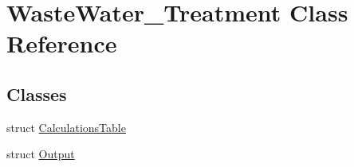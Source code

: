 \hypertarget{class_waste_water___treatment}{}\section{Waste\+Water\+\_\+\+Treatment Class Reference}
\label{class_waste_water___treatment}
\subsection*{Classes}
\begin{DoxyCompactItemize}
\item 
struct \hyperlink{struct_waste_water___treatment_1_1_calculations_table}{Calculations\+Table}
\item 
struct \hyperlink{struct_waste_water___treatment_1_1_output}{Output}
\end{DoxyCompactItemize}
